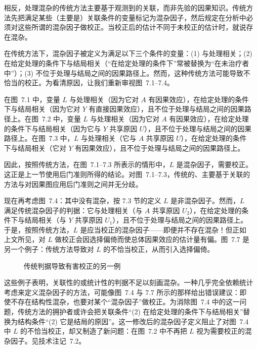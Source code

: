相反，处理混杂的传统方法主要基于观测到的关联，而非先验的因果知识。传统方法先把满足某些（主要是）关联条件的变量标记为混杂因子，然后规定在分析中必须对这些所谓的混杂因子做校正。当校正后的估计不同于未校正的估计时，就说存在混杂。

在传统方法下，混杂因子被定义为满足以下三个条件的变量：(1) 与处理相关；(2) 在给定处理的条件下与结局相关（“在给定处理的条件下”常被替换为“在未治疗者中”）；(3) 不位于处理与结局之间的因果路径上。然而，这种传统方法可能导致不恰当的校正。为看清原因，让我们重新审视图~7.1–7.4。

在图~7.1 中，变量 $L$ 与处理相关（因为它对 $A$ 有因果效应），在给定处理的条件下与结局相关（因为它对 $Y$ 有直接因果效应），且不位于处理与结局之间的因果路径上。在图~7.2 中，变量 $L$ 与处理相关（因为它对 $A$ 有因果效应），在给定处理的条件下与结局相关（因为它与 $Y$ 共享原因 $U$），且不位于处理与结局之间的因果路径上。在图~7.3 中，$L$ 与处理相关（它与 $A$ 共享原因 $U$），在给定处理的条件下与结局相关（它对 $Y$ 有因果效应），且不位于处理与结局之间的因果路径上。

因此，按照传统方法，在图~7.1–7.3 所表示的情形中，$L$ 是混杂因子，需要校正。这正是上一节使用后门准则所得的结论。对图~7.1–7.3，传统的、主要基于关联的方法与对因果图应用后门准则之间并无分歧。

现在再考虑图~7.4：其中没有混杂，按 7.3 节的定义 $L$ 是非混杂因子。然而，$L$ 满足传统混杂因子的判据：它与处理相关（与 $A$ 共享原因 $U_2$），在给定处理的条件下与结局相关（与 $Y$ 共享原因 $U_1$），且不位于处理与结局之间的因果路径上。于是，按照传统方法，$L$ 是应当校正的混杂因子——即便并不存在混杂！但正如上文所见，对 $L$ 做校正会因选择偏倚而使总体因果效应的估计量有偏。图~7.7 是另一个例子：传统方法导致对 $L$ 的不恰当校正，从而引入选择偏倚。

\begin{figure}[htbp]
\centering
{}
\caption{传统判据导致有害校正的另一例}
\label{fig:7.7}
\end{figure}

这些例子表明，关联性的或统计性的判据不足以刻画混杂。一种几乎完全依赖统计考虑来定义混杂因子的方法，可能像图~7.4 与 7.7 所示的那样给出错误建议：即使不存在结构性混杂，也要对某个“混杂因子”做校正。为消除图~7.4 中的这一问题，传统方法的拥护者或许会把关联条件“(2) 在给定处理的条件下与结局相关”替换为结构条件“(2) 它是结局的原因”。这一修改后的混杂因子定义阻止了对图~7.4 中 $L$ 的不恰当校正，却又制造了新问题：在图~7.2 中不再把 $L$ 视为需要校正的混杂因子。见技术注记~7.2。

